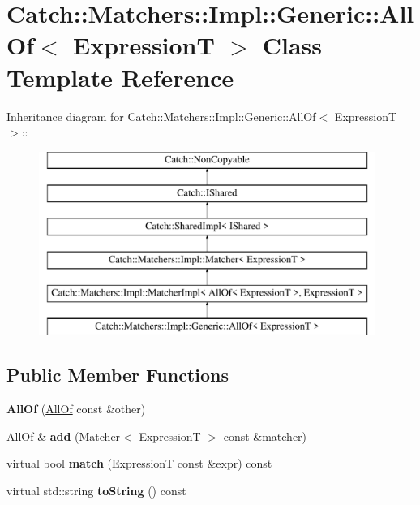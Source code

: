 \hypertarget{classCatch_1_1Matchers_1_1Impl_1_1Generic_1_1AllOf}{
\section{Catch::Matchers::Impl::Generic::AllOf$<$ ExpressionT $>$ Class Template Reference}
\label{classCatch_1_1Matchers_1_1Impl_1_1Generic_1_1AllOf}
}
Inheritance diagram for Catch::Matchers::Impl::Generic::AllOf$<$ ExpressionT $>$::\begin{figure}[H]
\begin{center}
\leavevmode
\includegraphics[height=6cm]{classCatch_1_1Matchers_1_1Impl_1_1Generic_1_1AllOf}
\end{center}
\end{figure}
\subsection*{Public Member Functions}
\begin{DoxyCompactItemize}
\item 
\hypertarget{classCatch_1_1Matchers_1_1Impl_1_1Generic_1_1AllOf_a31f7c5e570e79bdf64064ee87c331a59}{
{\bfseries AllOf} (\hyperlink{classCatch_1_1Matchers_1_1Impl_1_1Generic_1_1AllOf}{AllOf} const \&other)}
\label{classCatch_1_1Matchers_1_1Impl_1_1Generic_1_1AllOf_a31f7c5e570e79bdf64064ee87c331a59}

\item 
\hypertarget{classCatch_1_1Matchers_1_1Impl_1_1Generic_1_1AllOf_a8c5cd1e494ab697076da418ee72ac297}{
\hyperlink{classCatch_1_1Matchers_1_1Impl_1_1Generic_1_1AllOf}{AllOf} \& {\bfseries add} (\hyperlink{structCatch_1_1Matchers_1_1Impl_1_1Matcher}{Matcher}$<$ ExpressionT $>$ const \&matcher)}
\label{classCatch_1_1Matchers_1_1Impl_1_1Generic_1_1AllOf_a8c5cd1e494ab697076da418ee72ac297}

\item 
\hypertarget{classCatch_1_1Matchers_1_1Impl_1_1Generic_1_1AllOf_a04534d0ac9e089f4500c3c19054f11ce}{
virtual bool {\bfseries match} (ExpressionT const \&expr) const }
\label{classCatch_1_1Matchers_1_1Impl_1_1Generic_1_1AllOf_a04534d0ac9e089f4500c3c19054f11ce}

\item 
\hypertarget{classCatch_1_1Matchers_1_1Impl_1_1Generic_1_1AllOf_a9febc1e67acbeff62a32bcbfdc0c8fab}{
virtual std::string {\bfseries toString} () const }
\label{classCatch_1_1Matchers_1_1Impl_1_1Generic_1_1AllOf_a9febc1e67acbeff62a32bcbfdc0c8fab}

\end{DoxyCompactItemize}
